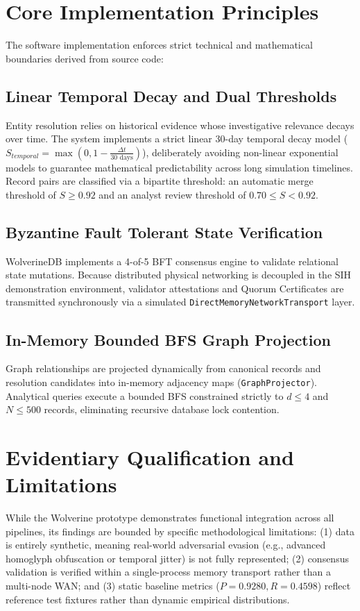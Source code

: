 \section{Core Implementation Principles}
\label{sec:implementation}

The software implementation enforces strict technical and mathematical boundaries derived from source code:

\subsection{Linear Temporal Decay and Dual Thresholds}
Entity resolution relies on historical evidence whose investigative relevance decays over time. The system implements a strict linear 30-day temporal decay model ($S_{temporal} = \max(0, 1 - \frac{\Delta t}{30\text{ days}})$), deliberately avoiding non-linear exponential models to guarantee mathematical predictability across long simulation timelines. Record pairs are classified via a bipartite threshold: an automatic merge threshold of $S \ge 0.92$ and an analyst review threshold of $0.70 \le S < 0.92$.

\subsection{Byzantine Fault Tolerant State Verification}
WolverineDB implements a 4-of-5 BFT consensus engine to validate relational state mutations. Because distributed physical networking is decoupled in the SIH demonstration environment, validator attestations and Quorum Certificates are transmitted synchronously via a simulated \texttt{DirectMemoryNetworkTransport} layer.

\subsection{In-Memory Bounded BFS Graph Projection}
Graph relationships are projected dynamically from canonical records and resolution candidates into in-memory adjacency maps (\texttt{GraphProjector}). Analytical queries execute a bounded BFS constrained strictly to $d \le 4$ and $N \le 500$ records, eliminating recursive database lock contention.

\section{Evidentiary Qualification and Limitations}
\label{sec:limitations}

While the Wolverine prototype demonstrates functional integration across all pipelines, its findings are bounded by specific methodological limitations: (1) data is entirely synthetic, meaning real-world adversarial evasion (e.g., advanced homoglyph obfuscation or temporal jitter) is not fully represented; (2) consensus validation is verified within a single-process memory transport rather than a multi-node WAN; and (3) static baseline metrics ($P=0.9280, R=0.4598$) reflect reference test fixtures rather than dynamic empirical distributions.

